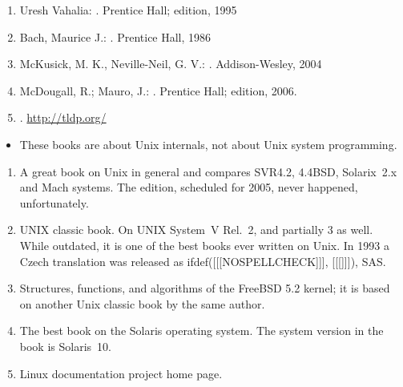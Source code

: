 
\begin{slide}

\begin{enumerate}
\item Uresh Vahalia: .
 Prentice Hall;  edition, 1995
\item Bach, Maurice J.: .
Prentice Hall, 1986
\item McKusick, M. K., Neville-Neil, G. V.: . Addison-Wesley, 2004
\item McDougall, R.; Mauro, J.: . Prentice Hall; 
edition, 2006.
\item {}. \url{http://tldp.org/}
\end{enumerate}
\end{slide}

\begin{itemize}
\item These books are about Unix internals, not about Unix system programming.
\end{itemize}

\begin{enumerate}
\item A great book on Unix in general and compares SVR4.2, 4.4BSD, Solarix~2.x
and Mach systems.  The  edition, scheduled for 2005, never happened,
unfortunately.
\item UNIX classic book. On UNIX System~V Rel.~2, and partially 3 as well.
While outdated, it is one of the best books ever written on Unix.  In 1993 a
Czech translation was released as
ifdef([[[NOSPELLCHECK]]],
[[[]]]), SAS.
\item Structures, functions, and algorithms of the FreeBSD 5.2 kernel; it is
based on another Unix classic book  by the same author.
\item The best book on the Solaris operating system.  The system version in the
book is Solaris~10.
\item Linux documentation project home page.
\end{enumerate}

